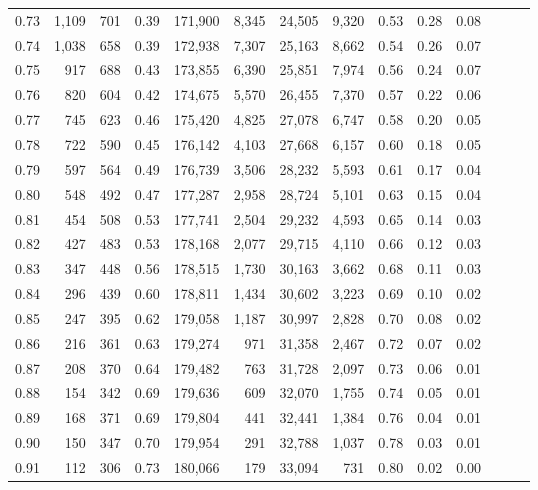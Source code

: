 \begin{tabular}{rrrrrrrrrrrrrr}
0.73 &  1,109 &  701 &  0.39 &  171,900 &    8,345 &  24,505 &   9,320 &  0.53 &  0.28 &      0.08 \\
0.74 &  1,038 &  658 &  0.39 &  172,938 &    7,307 &  25,163 &   8,662 &  0.54 &  0.26 &      0.07 \\
0.75 &    917 &  688 &  0.43 &  173,855 &    6,390 &  25,851 &   7,974 &  0.56 &  0.24 &      0.07 \\
0.76 &    820 &  604 &  0.42 &  174,675 &    5,570 &  26,455 &   7,370 &  0.57 &  0.22 &      0.06 \\
0.77 &    745 &  623 &  0.46 &  175,420 &    4,825 &  27,078 &   6,747 &  0.58 &  0.20 &      0.05 \\
0.78 &    722 &  590 &  0.45 &  176,142 &    4,103 &  27,668 &   6,157 &  0.60 &  0.18 &      0.05 \\
0.79 &    597 &  564 &  0.49 &  176,739 &    3,506 &  28,232 &   5,593 &  0.61 &  0.17 &      0.04 \\
0.80 &    548 &  492 &  0.47 &  177,287 &    2,958 &  28,724 &   5,101 &  0.63 &  0.15 &      0.04 \\
0.81 &    454 &  508 &  0.53 &  177,741 &    2,504 &  29,232 &   4,593 &  0.65 &  0.14 &      0.03 \\
0.82 &    427 &  483 &  0.53 &  178,168 &    2,077 &  29,715 &   4,110 &  0.66 &  0.12 &      0.03 \\
0.83 &    347 &  448 &  0.56 &  178,515 &    1,730 &  30,163 &   3,662 &  0.68 &  0.11 &      0.03 \\
0.84 &    296 &  439 &  0.60 &  178,811 &    1,434 &  30,602 &   3,223 &  0.69 &  0.10 &      0.02 \\
0.85 &    247 &  395 &  0.62 &  179,058 &    1,187 &  30,997 &   2,828 &  0.70 &  0.08 &      0.02 \\
0.86 &    216 &  361 &  0.63 &  179,274 &      971 &  31,358 &   2,467 &  0.72 &  0.07 &      0.02 \\
0.87 &    208 &  370 &  0.64 &  179,482 &      763 &  31,728 &   2,097 &  0.73 &  0.06 &      0.01 \\
0.88 &    154 &  342 &  0.69 &  179,636 &      609 &  32,070 &   1,755 &  0.74 &  0.05 &      0.01 \\
0.89 &    168 &  371 &  0.69 &  179,804 &      441 &  32,441 &   1,384 &  0.76 &  0.04 &      0.01 \\
0.90 &    150 &  347 &  0.70 &  179,954 &      291 &  32,788 &   1,037 &  0.78 &  0.03 &      0.01 \\
0.91 &    112 &  306 &  0.73 &  180,066 &      179 &  33,094 &     731 &  0.80 &  0.02 &      0.00 \\

\end{tabular}
